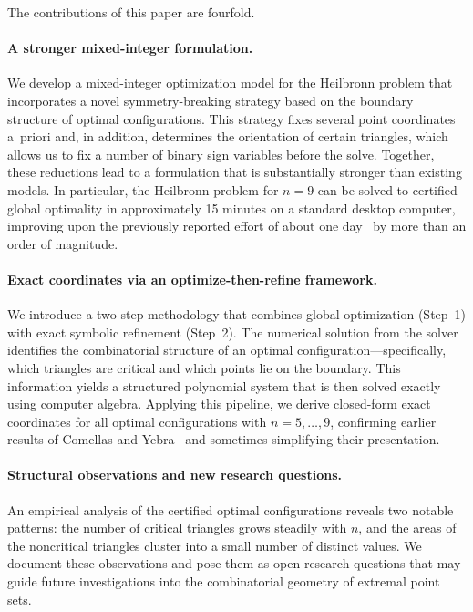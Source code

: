 \documentclass[11pt,a4paper]{article}
\theoremstyle{plain}
\theoremstyle{definition}
\theoremstyle{remark}
\begin{document}
The contributions of this paper are fourfold.

\paragraph{A stronger mixed-integer formulation.}
We develop a mixed-integer optimization model for the Heilbronn problem that incorporates a novel symmetry-breaking strategy based on the boundary structure of optimal configurations.  This strategy fixes several point coordinates a~priori and, in addition, determines the orientation of certain triangles, which allows us to fix a number of binary sign variables before the solve.
Together, these reductions lead to a formulation that is substantially stronger than existing models.  In particular, the Heilbronn problem for $n=9$ can be solved to certified global optimality in approximately 15 minutes on a standard desktop computer, improving upon the previously reported effort of about one day~\cite{monji2025solvingheilbronntriangleproblem} by more than an order of magnitude.

\paragraph{Exact coordinates via an optimize-then-refine framework.}
We introduce a two-step methodology that combines global optimization (Step~1) with exact symbolic refinement (Step~2).  The numerical solution from the solver identifies the 
combinatorial structure of an optimal configuration---specifically, which triangles are critical and which points lie on the boundary.  This information yields a structured 
polynomial system that is then solved exactly using computer algebra.  Applying this pipeline, we derive closed-form exact coordinates for all optimal configurations 
with $n = 5, \ldots, 9$, confirming earlier results of Comellas and Yebra~\cite{comellasyebra2002} and sometimes simplifying their presentation.
\paragraph{Structural observations and new research questions.}
An empirical analysis of the certified optimal configurations reveals two notable patterns: the number of critical triangles grows steadily with $n$, and the areas of the noncritical triangles cluster into a small number of distinct values.  We document these observations and pose them as open research questions that may guide future investigations into the combinatorial geometry of extremal point sets.
\end{document}
